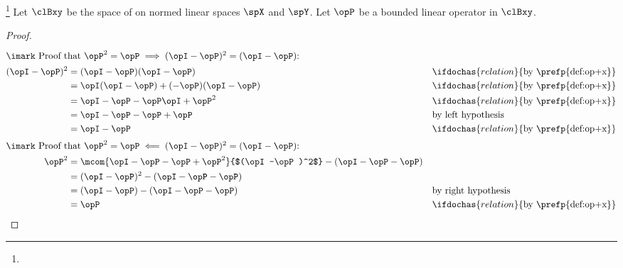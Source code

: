 \begin{theorem}
\label{thm:op_PIP}
\footnote{
  }
Let $\clBxy $ be the space of  on normed linear spaces $\spX$ and $\spY$.
Let $\opP$ be a bounded linear operator in $\clBxy$.
\end{theorem}
\begin{proof}
\begin{align*}
  \intertext{$\imark$ Proof that
    $\opP^2=\opP \implies (\opI-\opP)^2=(\opI-\opP)$:}
  (\opI-\opP)^2
    &= (\opI-\opP)(\opI-\opP)
    && \ifdochas{relation}{\text{by \prefp{def:op+x}}}
  \\&= \opI(\opI-\opP) + (-\opP)(\opI-\opP)
    && \ifdochas{relation}{\text{by \prefp{def:op+x}}}
  \\&= \opI-\opP -\opP\opI + \opP^2
    && \ifdochas{relation}{\text{by \prefp{def:op+x}}}
  \\&= \opI-\opP -\opP + \opP
    && \text{by left hypothesis}
  \\&= \opI-\opP
    && \ifdochas{relation}{\text{by \prefp{def:op+x}}}
  \\
  \intertext{$\imark$ Proof that
    $\opP^2=\opP \impliedby (\opI-\opP)^2=(\opI-\opP)$:}
  \opP^2
    &= \mcom{\opI -\opP -\opP + \opP^2}{$(\opI-\opP)^2$} -(\opI -\opP-\opP)
  \\&= (\opI-\opP)^2 -(\opI -\opP-\opP)
  \\&= (\opI-\opP) -(\opI -\opP-\opP)
    && \text{by right hypothesis}
  \\&= \opP
    && \ifdochas{relation}{\text{by \prefp{def:op+x}}}
\end{align*}
\end{proof}

